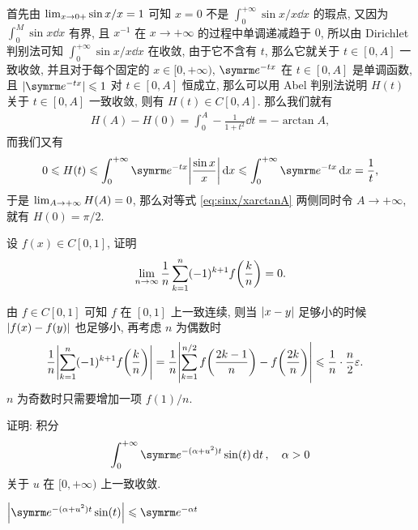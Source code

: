 \begin{exercise}[series=exer]
\begin{answer}
        首先由 $ \lim_{x \to 0+}\sin x/x = 1 $ 可知 $ x = 0 $ 不是 $ \int_{0}^{+\infty}\sin x/x \dd{x} $ 的瑕点, 又因为 $ \int_{0}^{M}\sin x\dd{x} $ 有界, 且 $ x^{-1} $ 在 $ x \to +\infty $ 的过程中单调递减趋于 $ 0 $, 所以由 Dirichlet 判别法可知 $ \int_{0}^{+\infty} \sin x/x \dd{x} $ 在收敛, 由于它不含有 $ t $, 那么它就关于 $ t\in [0, A] $ 一致收敛, 并且对于每个固定的 $ x \in [0, +\infty) $, $ \me^{-tx} $ 在 $ t\in[0, A] $ 是单调函数, 且 $ \abs{\me^{-tx}} \le 1 $ 对 $ t \in [0, A] $ 恒成立, 那么可以用 Abel 判别法说明 $ H(t) $ 关于 $ t \in [0, A] $ 一致收敛, 则有 $ H(t) \in C[0, A] $. 那么我们就有
        \begin{align}\label{eq:sinx/xarctanA}
            H(A) - H(0) = \int_{0}^{A} -\frac{1}{1 + t^{2}} \dd{t} = -\arctan A,
        \end{align}
        而我们又有
        \begin{align*}
            0 \le H(t) \le \int_{0}^{+\infty} \me^{-tx}\abs{\frac{\sin x}{x}} \dd{x} \le \int_{0}^{+\infty} \me^{-tx} \dd{x} = \frac{1}{t},
        \end{align*}
        于是 $ \lim_{A \to +\infty} H(A) = 0 $, 那么对等式 \eqref{eq:sinx/xarctanA} 两侧同时令 $ A \to +\infty $, 就有 $ H(0) = \pi/2 $.
    \end{answer}
    \item 设 $ f(x) \in C[0, 1] $, 证明
    \begin{align*}
        \lim_{n \to \infty} \frac{1}{n} \sum_{k=1}^{n} (-1)^{k+1} f\qty(\frac{k}{n}) = 0.
    \end{align*}
    \begin{hint}
        由 $ f \in C[0, 1] $ 可知 $ f $ 在 $ [0, 1] $ 上一致连续, 则当 $ \abs{x - y} $ 足够小的时候 $ \abs{f(x) - f(y)} $ 也足够小, 再考虑 $ n $ 为偶数时
        \begin{align*}
            \frac{1}{n} \abs{\sum_{k=1}^{n} (-1)^{k+1} f\qty(\frac{k}{n})} & = \frac{1}{n}\abs{\sum_{k = 1}^{n/2}f\qty(\frac{2k-1}{n}) - f\qty(\frac{2k}{n})} \leqslant \frac{1}{n}\cdot\frac{n}{2}\varepsilon.
        \end{align*}
        $ n $ 为奇数时只需要增加一项 $ f(1)/n $.
    \end{hint}
    \item 证明: 积分 
    \begin{align*}
        \int_{0}^{+\infty} \me^{-(\alpha + u^{2})t} \sin(t) \dd{t},\quad \alpha > 0
    \end{align*}
    关于 $ u $ 在 $ [0, +\infty) $ 上一致收敛.    
    \begin{hint}
        $ \abs{\me^{-(\alpha + u^{2})t} \sin(t)} \le \me^{-\alpha t} $ 

\end{hint}
\end{exercise}
